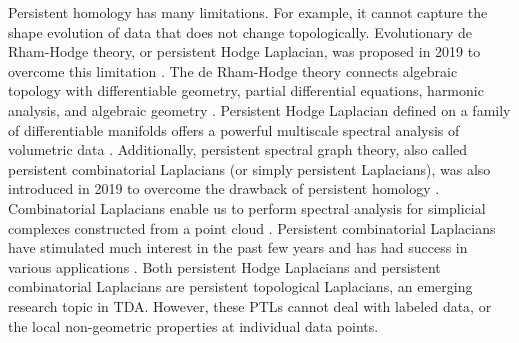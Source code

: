 \documentclass[11pt]{article}
\theoremstyle{definition}
\theoremstyle{definition}
\begin{document}
Persistent homology has many limitations. 
For example, it cannot capture the shape evolution of data that does not change topologically.
Evolutionary de Rham-Hodge theory, or persistent Hodge Laplacian, was proposed in 2019 to overcome this limitation \cite{chen2019evolutionary}.   
The de Rham-Hodge theory connects algebraic topology with differentiable geometry, partial differential equations, harmonic analysis, and algebraic geometry \cite{dodziuk1977rham,zhao2020rham}. 
Persistent Hodge Laplacian defined on a family of differentiable manifolds offers a powerful multiscale spectral analysis of volumetric data \cite{chen2019evolutionary}.  
Additionally, persistent spectral graph theory, also called persistent combinatorial Laplacians (or simply persistent Laplacians), 
was also introduced in 2019 to overcome the drawback of  persistent homology \cite{wang2020persistent}. 
{ Combinatorial Laplacians enable us to perform spectral analysis for simplicial complexes constructed from a point cloud \cite{chung1997spectral, grone1990laplacian, lim2020hodge}.}  
Persistent combinatorial Laplacians have stimulated much interest in the past few years \cite{memoli2022persistent, wang2021hermes, liu2023algebraic} and has had success in various applications \cite{meng2021persistent,chen2022persistent,qiu2023persistent}. Both persistent Hodge  Laplacians and persistent combinatorial Laplacians are  persistent topological Laplacians, an emerging research topic in TDA.  
However, these PTLs cannot deal with labeled data, or the local non-geometric properties at individual data points.  
\end{document}
